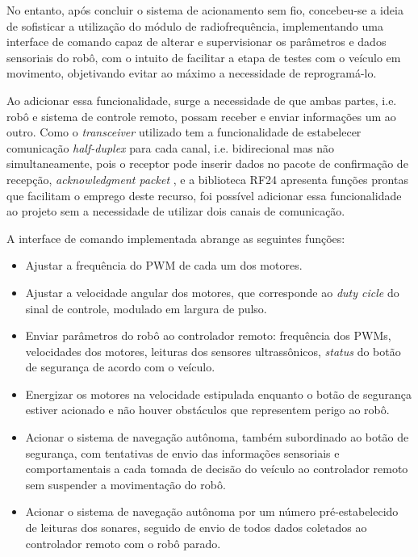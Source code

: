 No entanto, após concluir o sistema de acionamento sem fio, concebeu-se a ideia de sofisticar a utilização do módulo de radiofrequência, 
implementando uma interface de comando capaz de alterar e supervisionar os parâmetros e dados sensoriais do robô, com o intuito de facilitar a etapa 
de testes com o veículo em movimento, objetivando evitar ao máximo a necessidade de reprogramá-lo.

Ao adicionar essa funcionalidade, surge a necessidade de que ambas partes, i.e. robô e sistema de controle remoto, possam receber e enviar 
informações um ao outro.
Como o \textit{transceiver} utilizado tem a funcionalidade de estabelecer comunicação \textit{half-duplex} para cada canal, i.e. bidirecional mas não 
simultaneamente, pois o receptor pode inserir dados no pacote de confirmação de recepção, \textit{acknowledgment packet} \cite{nRF}, e a biblioteca 
RF24 apresenta funções prontas que facilitam o emprego deste recurso, foi possível adicionar essa funcionalidade ao projeto sem a necessidade de 
utilizar dois canais de comunicação.

A interface de comando implementada abrange as seguintes funções:
\begin{itemize}
 \item 
Ajustar a frequência do PWM de cada um dos motores.
 \item 
Ajustar a velocidade angular dos motores, que corresponde ao \textit{duty cicle} do sinal de controle, modulado em largura de pulso.
 \item 
 Enviar parâmetros do robô ao controlador remoto: frequência dos PWMs, velocidades dos motores, leituras dos sensores ultrassônicos, 
\textit{status} do botão de segurança de acordo com o veículo.
 \item 
Energizar os motores na velocidade estipulada enquanto o botão de segurança estiver acionado e não houver obstáculos que representem perigo ao robô.
 \item 
Acionar o sistema de navegação autônoma, também subordinado ao botão de segurança, com tentativas de envio das informações sensoriais e 
comportamentais a cada tomada de decisão do veículo ao controlador remoto sem suspender a movimentação do robô.
 \item 
 Acionar o sistema de navegação autônoma por um número pré-estabelecido de leituras dos sonares, seguido de envio de todos dados coletados ao 
controlador remoto com o robô parado.
\end{itemize}



